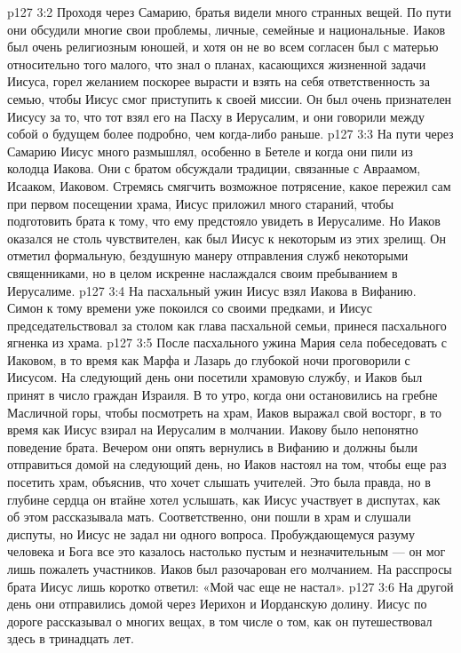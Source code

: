 \vs p127 3:2 Проходя через Самарию, братья видели много странных вещей. По пути они обсудили многие свои проблемы, личные, семейные и национальные. Иаков был очень религиозным юношей, и хотя он не во всем согласен был с матерью относительно того малого, что знал о планах, касающихся жизненной задачи Иисуса, горел желанием поскорее вырасти и взять на себя ответственность за семью, чтобы Иисус смог приступить к своей миссии. Он был очень признателен Иисусу за то, что тот взял его на Пасху в Иерусалим, и они говорили между собой о будущем более подробно, чем когда\hyp{}либо раньше.
\vs p127 3:3 На пути через Самарию Иисус много размышлял, особенно в Бетеле и когда они пили из колодца Иакова. Они с братом обсуждали традиции, связанные с Авраамом, Исааком, Иаковом. Стремясь смягчить возможное потрясение, какое пережил сам при первом посещении храма, Иисус приложил много стараний, чтобы подготовить брата к тому, что ему предстояло увидеть в Иерусалиме. Но Иаков оказался не столь чувствителен, как был Иисус к некоторым из этих зрелищ. Он отметил формальную, бездушную манеру отправления служб некоторыми священниками, но в целом искренне наслаждался своим пребыванием в Иерусалиме.
\vs p127 3:4 На пасхальный ужин Иисус взял Иакова в Вифанию. Симон к тому времени уже покоился со своими предками, и Иисус председательствовал за столом как глава пасхальной семьи, принеся пасхального ягненка из храма.
\vs p127 3:5 После пасхального ужина Мария села побеседовать с Иаковом, в то время как Марфа и Лазарь до глубокой ночи проговорили с Иисусом. На следующий день они посетили храмовую службу, и Иаков был принят в число граждан Израиля. В то утро, когда они остановились на гребне Масличной горы, чтобы посмотреть на храм, Иаков выражал свой восторг, в то время как Иисус взирал на Иерусалим в молчании. Иакову было непонятно поведение брата. Вечером они опять вернулись в Вифанию и должны были отправиться домой на следующий день, но Иаков настоял на том, чтобы еще раз посетить храм, объяснив, что хочет слышать учителей. Это была правда, но в глубине сердца он втайне хотел услышать, как Иисус участвует в диспутах, как об этом рассказывала мать. Соответственно, они пошли в храм и слушали диспуты, но Иисус не задал ни одного вопроса. Пробуждающемуся разуму человека и Бога все это казалось настолько пустым и незначительным --- он мог лишь пожалеть участников. Иаков был разочарован его молчанием. На расспросы брата Иисус лишь коротко ответил: «Мой час еще не настал».
\vs p127 3:6 На другой день они отправились домой через Иерихон и Иорданскую долину. Иисус по дороге рассказывал о многих вещах, в том числе о том, как он путешествовал здесь в тринадцать лет.

